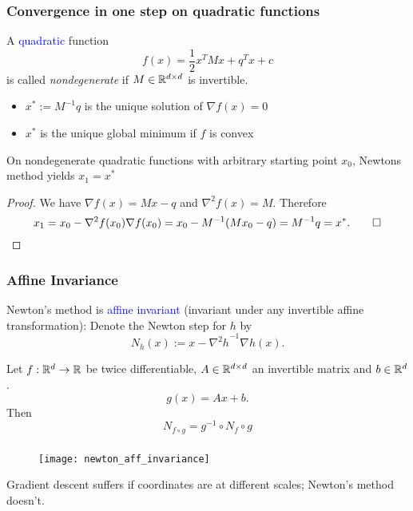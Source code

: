 \documentclass{beamer}
\begin{document}
\begin{frame}
  \frametitle{Convergence in one step on quadratic functions}
  A \textcolor{blue}{quadratic} function
  \begin{equation}
    f(x) = \frac12 x^T M x + q^T x + c
  \end{equation}
  is called \textit{nondegenerate} if $M \in \mathbb{R}^{d \times d}$ is invertible.
  \begin{itemize}
    \item $x^* := M^{-1}q$ is the unique solution of $\nabla f(x) = 0$
    \item $x^*$ is the unique global minimum if $f$ is convex
  \end{itemize}
  \begin{lemma}%
    On nondegenerate quadratic functions with arbitrary starting point $x_0$, Newtons method yields $x_1=x^*$
  \end{lemma}
  \begin{proof}
    We have $\nabla f(x) = Mx -q$ and $\nabla^2 f(x) = M$. Therefore
    \begin{equation}
      x_1 = x_0 - \nabla^2 f(x_0) \nabla f(x_0) = x_0 - M^{-1}(M x_0 - q) = M^{-1}q = x^*. \qed\qedhere
    \end{equation}
  \end{proof}
\end{frame}

\begin{frame}
  \frametitle{Affine Invariance}
  Newton’s method is \textcolor{blue}{affine invariant}
  (invariant under any invertible affine transformation):
  Denote the Newton step for $h$ by
  \begin{equation}
    N_h(x) := x - {\nabla^2 h }^{-1} \nabla h(x).
  \end{equation}
  \begin{lemma}%
    Let $f: \mathbb{R}^d \to \mathbb{R}$ be twice differentiable, $A \in \mathbb{R}^{d \times d}$ an invertible matrix and $b \in \mathbb{R}^d$.
    \begin{equation}
      g(x) = Ax + b.
    \end{equation}
    Then
    \begin{equation}
      N_{f \circ g} = g^{-1} \circ N_f \circ g
    \end{equation}
  \end{lemma}
\end{frame}

\begin{frame}
  \frametitle{}
  \begin{figure}[ht]
    \centering
    \texttt{[image: newton\_aff\_invariance]}
  \end{figure}
  Gradient descent suffers if coordinates are at different scales; Newton's method doesn't.
\end{frame}
\end{document}
